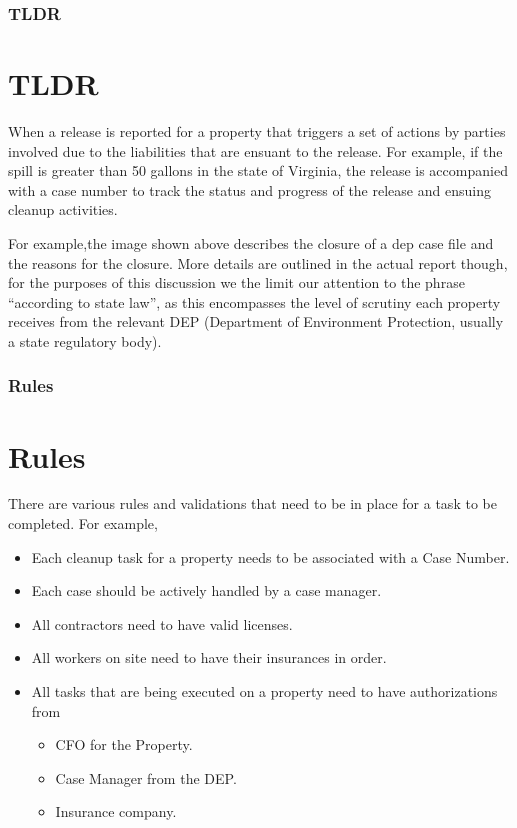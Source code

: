 \documentclass{beamer}
\newcommand{\quotes}[1]{``#1''}
\begin{document}
\begin{frame}
\frametitle{TLDR}
\section{TLDR}
  When a release is reported for a property that triggers a set of actions by parties involved due to the liabilities that are ensuant to the release. For example, if the spill is greater than 50 gallons in the state of Virginia, the release is accompanied with a case number to track the status and progress of the release and ensuing cleanup activities.

  For example,the image shown above describes the closure of a dep case file and the reasons for the closure. More details are outlined in the actual report though, for the purposes of this discussion we the limit our attention to the phrase \quotes{according to state law}, as this encompasses the level of scrutiny each property receives from the relevant DEP (Department of Environment Protection, usually a state regulatory body). 

\end{frame}

\begin{frame}

\frametitle{Rules}
\section{Rules}
  There are various rules and validations that need to be in place for a task to be completed. For example, 
    \begin{itemize}
        \item Each cleanup task for a property needs to be associated with a Case Number. 
        \item Each case should be actively handled by a case manager.
        \item All contractors need to have valid licenses.
        \item All workers on site need to have their insurances in order.
        \item All tasks that are being executed on a property need to have authorizations from
          \begin{itemize}
            \item CFO for the Property.
            \item Case Manager from the DEP.
            \item Insurance company. 
          \end{itemize}
    \end{itemize}
\end{frame}
\end{document}

